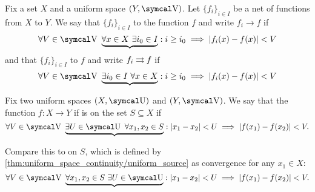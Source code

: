 \begin{definition}\label{def:function_net_convergence}
  Fix a set \( X \) and a uniform space \( (Y, \V) \). Let \( \{ f_i \}_{i \in I} \) be a net of functions from \( X \) to \( Y \). We say that \( \{ f_i \}_{i \in I} \)  to the function \( f \) and write \( f_i \to f \) if
  \begin{equation}\label{def:function_net_convergence/pointwise}
    \forall V \in \V \ \underbrace{\forall x \in X \ \exists i_0 \in I} : i \geq i_0 \implies \Abs{f_i(x) - f(x)} < V
  \end{equation}
  and that \( \{ f_i \}_{i \in I} \)  to \( f \) and write \( f_i \rightrightarrows f \) if
  \begin{equation}\label{def:function_net_convergence/uniform}
    \forall V \in \V \ \underbrace{\exists i_0 \in I \ \forall x \in X} : i \geq i_0 \implies \Abs{f_i(x) - f(x)} < V
  \end{equation}
\end{definition}

\begin{definition}\label{def:uniform_continuity}\cite[435]{Engelking1989}
  Fix two uniform spaces \( (X, \U) \) and \( (Y, \V) \). We say that the function \( f: X \to Y \) if is  on the set \( S \subseteq X \) if
  \begin{equation}\label{def:uniform_continuity/uniform}
    \forall V \in \V \ \underbrace{\exists U \in \U \ \forall x_1, x_2 \in S} : \Abs{x_1 - x_2} < U \implies \Abs{f(x_1) - f(x_2)} < V.
  \end{equation}

  Compare this to  on \( S \), which is defined by \cref{thm:uniform_space_continuity/uniform_source} as convergence for any \( x_1 \in X \):
  \begin{equation}\label{def:uniform_continuity/pointwise}
    \forall V \in \V \ \underbrace{\forall x_1, x_2 \in S \ \exists U \in \U} : \Abs{x_1 - x_2} < U \implies \Abs{f(x_1) - f(x_2)} < V.
  \end{equation}
\end{definition}

